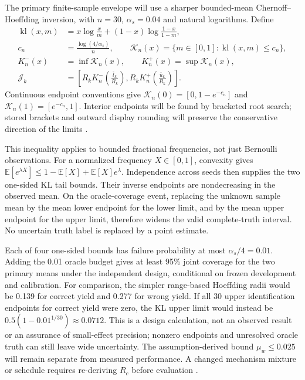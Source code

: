 \documentclass[11pt,a4paper]{article}
\begin{document}
The primary finite-sample envelope will use a sharper bounded-mean
Chernoff--Hoeffding inversion, with $n=30$, $\alpha_s=0.04$ and natural
logarithms. Define
\begin{align}
\operatorname{kl}(x,m)&=x\log\frac{x}{m}
 +(1-x)\log\frac{1-x}{1-m},\\
c_n&=\frac{\log(4/\alpha_s)}{n},\qquad
\mathcal K_n(x)=\{m\in[0,1]:\operatorname{kl}(x,m)\leq c_n\},\\
K_n^-(x)&=\inf\mathcal K_n(x),\qquad
K_n^+(x)=\sup\mathcal K_n(x),\\
\mathcal J_k&=\left[R_k K_n^-\!\left(\frac{\overline l_k}{R_k}\right),
 R_k K_n^+\!\left(\frac{\overline u_k}{R_k}\right)\right].
\end{align}
Continuous endpoint conventions give
$\mathcal K_n(0)=[0,1-e^{-c_n}]$ and
$\mathcal K_n(1)=[e^{-c_n},1]$. Interior endpoints will be found by bracketed
root search; stored brackets and outward display rounding will preserve the
conservative direction of the limits \cite{hoeffding}.

This inequality applies to bounded fractional frequencies, not just Bernoulli
observations. For a normalized frequency $X\in[0,1]$, convexity gives
$\mathbb E[e^{\lambda X}]\leq1-\mathbb E[X]+\mathbb E[X]e^\lambda$.
Independence across seeds then supplies the two one-sided KL tail bounds.
Their inverse endpoints are nondecreasing in the observed mean. On the
oracle-coverage event, replacing the unknown sample mean by the mean lower
endpoint for the lower limit, and by the mean upper endpoint for the upper
limit, therefore widens the valid complete-truth interval. No uncertain truth
label is replaced by a point estimate.

Each of four one-sided bounds has failure probability at most
$\alpha_s/4=0.01$. Adding the 0.01 oracle budget gives at least 95\% joint
coverage for the two primary means under the independent design, conditional
on frozen development and calibration. For comparison, the simpler
range-based Hoeffding radii would be 0.139 for correct yield and 0.277 for
wrong yield. If all 30 upper identification endpoints for correct yield were
zero, the KL upper limit would instead be
$0.5(1-0.01^{1/30})\approx0.0712$. This is a design calculation, not an
observed result or an assurance of small-effect precision; nonzero endpoints
and unresolved oracle truth can still leave wide uncertainty.
The assumption-derived bound $\mu_w\leq0.025$ will remain separate from
measured performance. A changed mechanism mixture or schedule requires
re-deriving $R_c$ before evaluation \cite{hoeffding}.
\end{document}
